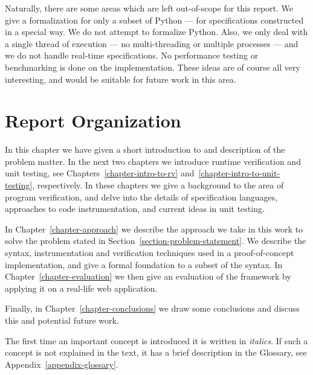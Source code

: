 Naturally, there are some areas which are left out-of-scope for this report. We
give a formalization for only a subset of Python --- for specifications
constructed in a special way. We do not attempt to formalize Python. Also, we
only deal with a single thread of execution --- no multi-threading or multiple
processes --- and we do not handle real-time specifications. No performance
testing or benchmarking is done on the implementation. These ideas are of
course all very interesting, and would be suitable for future work in this
area.


\section{Report Organization}

In this chapter we have given a short introduction to and description of the
problem matter. In the next two chapters we introduce runtime verification and
unit testing, see Chapters~\ref{chapter-intro-to-rv}
and~\ref{chapter-intro-to-unit-testing}, respectively. In these chapters we
give a background to the area of program verification, and delve into the
details of specification languages, approaches to code instrumentation, and
current ideas in unit testing.

In Chapter~\ref{chapter-approach} we describe the approach we take in this work to
solve the problem stated in Section~\ref{section-problem-statement}. We
describe the syntax, instrumentation and verification techniques used in a
proof-of-concept implementation, and give a formal foundation to a subset of
the syntax. In Chapter~\ref{chapter-evaluation} we then give an evaluation of
the framework by applying it on a real-life web application.

Finally, in Chapter~\ref{chapter-conclusions} we draw some conclusions and
discuss this and potential future work.

The first time an important concept is introduced it is written in
\textit{italics}. If such a concept is not explained in the text, it has a
brief description in the Glossary, see Appendix~\ref{appendix-glossary}.
